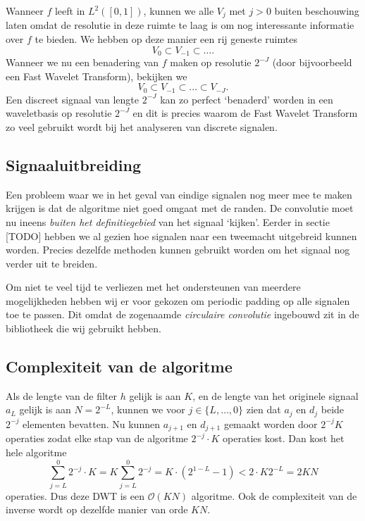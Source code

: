 \documentclass[11pt]{report}
\theoremstyle{plain}
\theoremstyle{definition}
\theoremstyle{remark}
\begin{document}
Wanneer $f$ leeft in $L^2([0,1])$, kunnen we alle $V_j$ met $j > 0$ buiten beschouwing laten omdat de resolutie in deze ruimte te laag is om nog interessante informatie over $f$ te bieden. We hebben op deze manier een rij geneste ruimtes
\[
V_0 \subset V_{-1} \subset \ldots.
\]
Wanneer we nu een benadering van $f$ maken op resolutie $2^{-J}$ (door bijvoorbeeld een Fast Wavelet Transform), bekijken we
\[
	V_0 \subset V_{-1} \subset \ldots \subset V_{-J}.
\]
Een discreet signaal van lengte $2^{-J}$ kan zo perfect `benaderd' worden in een waveletbasis op resolutie $2^{-J}$ en dit is precies waarom de Fast Wavelet Transform zo veel gebruikt wordt bij het analyseren van discrete signalen.

\subsection{Signaaluitbreiding}
Een probleem waar we in het geval van eindige signalen nog meer mee te maken krijgen is dat de algoritme niet goed omgaat met de randen. De convolutie moet nu ineens \emph{buiten het definitiegebied} van het signaal `kijken'. Eerder in sectie [TODO] hebben we al gezien hoe signalen naar een tweemacht uitgebreid kunnen worden. Precies dezelfde methoden kunnen gebruikt worden om het signaal nog verder uit te breiden. 

Om niet te veel tijd te verliezen met het ondersteunen van meerdere mogelijkheden hebben wij er voor gekozen om periodic padding op alle signalen toe te passen. Dit omdat de zogenaamde \emph{circulaire convolutie} ingebouwd zit in de bibliotheek die wij gebruikt hebben.

\subsection{Complexiteit van de algoritme}
Als de lengte van de filter $h$ gelijk is aan $K$, en de lengte van het originele signaal $a_L$ gelijk is aan $N = 2^{-L}$, kunnen we voor $j \in \{L, \ldots, 0\}$ zien dat $a_j$ en $d_j$ beide $2^{-j}$ elementen bevatten. Nu kunnen $a_{j+1}$ en $d_{j+1}$ gemaakt worden door $2^{-j}K$ operaties zodat elke stap van de algoritme $2^{-j} \cdot K$ operaties kost. Dan kost het hele algoritme
\[
	\sum_{j=L}^0 2^{-j} \cdot K = K \sum_{j=L}^0 2^{-j} = K \cdot (2^{1-L} - 1) < 2 \cdot K 2^{-L} = 2KN
\]
operaties. Dus deze DWT is een $\mathcal{O}(KN)$ algoritme. Ook de complexiteit van de inverse wordt op dezelfde manier van orde $KN$. 
\end{document}
